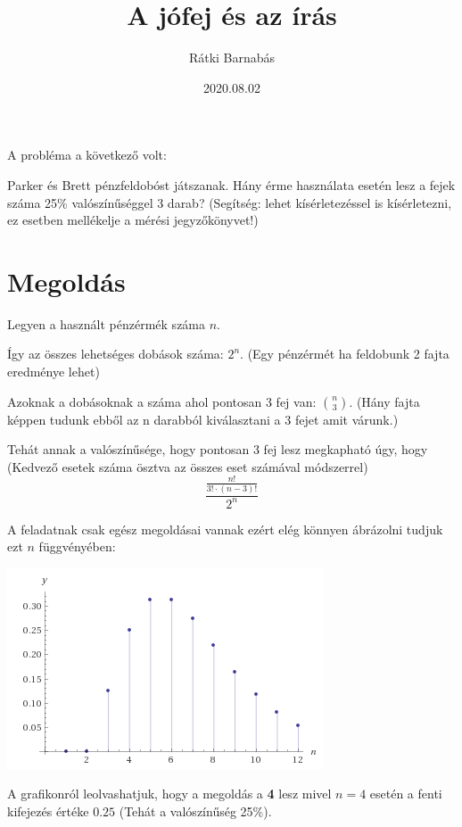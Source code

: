 \documentclass{article}[12pt,a4paper]
\title{A jófej és az írás}
\author{Rátki Barnabás}
\date{2020.08.02}
\begin{document}
\maketitle

A probléma a következő volt:
\begin{displayquote}
Parker és Brett pénzfeldobóst játszanak. Hány érme használata esetén lesz a fejek száma 25\% valószínűséggel 3 darab? (Segítség:  lehet kísérletezéssel is kísérletezni, ez esetben mellékelje a mérési jegyzőkönyvet!)
\end{displayquote}

\section{Megoldás}

Legyen a használt pénzérmék száma $n$.

Így az összes lehetséges dobások száma: $2^n$. (Egy pénzérmét ha feldobunk 2 fajta eredménye lehet)\par
Azoknak a dobásoknak a száma ahol pontosan 3 fej van: ${n}\choose{3}$. (Hány fajta képpen tudunk ebből az n darabból kiválasztani a 3 fejet amit várunk.)\par

Tehát annak a valószínűsége, hogy pontosan 3 fej lesz megkapható úgy, hogy (Kedvező esetek száma ösztva az összes eset számával módszerrel) $$\frac{\frac{n!}{3!\cdot(n-3)!}}{2^n}$$ \par
A feladatnak csak egész megoldásai vannak ezért elég könnyen ábrázolni tudjuk ezt $n$ függvényében: 
\begin{center}
\includegraphics{graf1} 
\end{center}

A grafikonról leolvashatjuk, hogy a megoldás a \textbf{4} lesz mivel $n=4$ esetén a fenti kifejezés értéke $0.25$ (Tehát a valószínűség 25\%).
\end{document}
